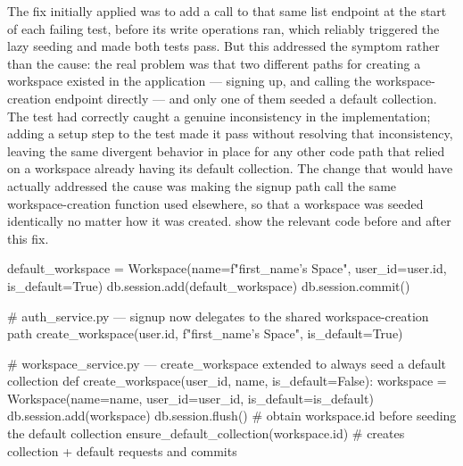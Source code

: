 The fix initially applied was to add a call to that same list endpoint at the start of each failing test, before its write operations ran, which reliably triggered the lazy seeding and made both tests pass. But this addressed the symptom rather than the cause: the real problem was that two different paths for creating a workspace existed in the application --- signing up, and calling the workspace-creation endpoint directly --- and only one of them seeded a default collection. The test had correctly caught a genuine inconsistency in the implementation; adding a setup step to the test made it pass without resolving that inconsistency, leaving the same divergent behavior in place for any other code path that relied on a workspace already having its default collection. The change that would have actually addressed the cause was making the signup path call the same workspace-creation function used elsewhere, so that a workspace was seeded identically no matter how it was created.  show the relevant code before and after this fix.

\begin{listing}[H]
\begin{center}
\begin{codebox}
default_workspace = Workspace(name=f"{first_name}'s Space", user_id=user.id, is_default=True)
db.session.add(default_workspace)
db.session.commit()
\end{codebox}
\end{center}
\caption{Signup path creating a workspace directly, bypassing \texttt{create\_workspace()}.}
\label{lst:workspace-bug}
\end{listing}

\begin{listing}[H]
\begin{center}
\begin{codebox}
# auth_service.py --- signup now delegates to the shared workspace-creation path
create_workspace(user.id, f"{first_name}'s Space", is_default=True)

# workspace_service.py --- create_workspace extended to always seed a default collection
def create_workspace(user_id, name, is_default=False):
    workspace = Workspace(name=name, user_id=user_id, is_default=is_default)
    db.session.add(workspace)
    db.session.flush()  # obtain workspace.id before seeding the default collection
    ensure_default_collection(workspace.id)  # creates collection + default requests and commits
\end{codebox}
\end{center}
\caption{Fix --- signup delegates to \texttt{create\_workspace()}, which is extended to always seed a default collection.}
\label{lst:workspace-fix}
\end{listing}


